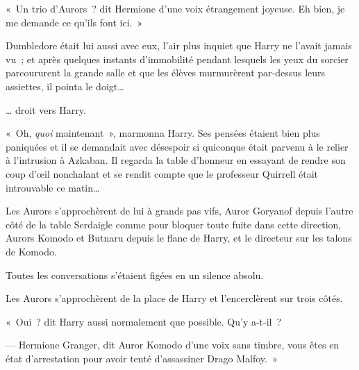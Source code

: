 «~Un trio d'Aurors~? dit Hermione d'une voix étrangement joyeuse. Eh bien, je me demande ce qu'ils font ici.~»

Dumbledore était lui aussi avec eux, l'air plus inquiet que Harry ne l'avait jamais vu~; et après quelques instants d'immobilité pendant lesquels les yeux du sorcier parcoururent la grande salle et que les élèves murmurèrent par-dessus leurs assiettes, il pointa le doigt…

… droit vers Harry.

«~Oh, \emph{quoi} maintenant~», marmonna Harry. Ses pensées étaient bien plus paniquées et il se demandait avec désespoir si quiconque était parvenu à le relier à l'intrusion à Azkaban. Il regarda la table d'honneur en essayant de rendre son coup d'œil nonchalant et se rendit compte que le professeur Quirrell était introuvable ce matin…

Les Aurors s'approchèrent de lui à grands pas vifs, Auror Goryanof depuis l'autre côté de la table Serdaigle comme pour bloquer toute fuite dans cette direction, Aurors Komodo et Butnaru depuis le flanc de Harry, et le directeur sur les talons de Komodo.

Toutes les conversations s'étaient figées en un silence absolu.

Les Aurors s'approchèrent de la place de Harry et l'encerclèrent sur trois côtés.

«~Oui~? dit Harry aussi normalement que possible. Qu'y a-t-il~?

--- Hermione Granger, dit Auror Komodo d'une voix sans timbre, vous êtes en état d'arrestation pour avoir tenté d'assassiner Drago Malfoy.~»
